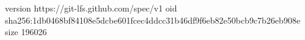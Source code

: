 version https://git-lfs.github.com/spec/v1
oid sha256:1db0468bf84108e5dcbe601fcec4ddcc31b46df9f6eb82e50bcb9c7b26eb908e
size 196026
